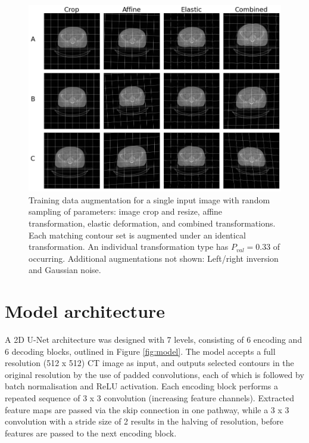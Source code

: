 \begin{figure}[h]
	\begin{center}
		\includegraphics[width=1\textwidth]{figures/augment}
		\caption{Training data augmentation for a single input image with random
      sampling of parameters: image crop and resize, affine transformation,
      elastic deformation, and combined transformations. Each matching contour
      set is augmented under an identical transformation. An individual
      transformation type has $P_{val}=0.33$ of occurring. Additional
      augmentations not shown: Left/right inversion and Gaussian noise.}
		\label{fig:augment}
	\end{center}
\end{figure}

\section{Model architecture}
\label{ch:method-architecture} A 2D U-Net architecture was designed with 7
levels, consisting of 6 encoding and 6 decoding blocks, outlined in Figure
\ref{fig:model}. The model accepts a full resolution (512 x 512) CT image as
input, and outputs selected contours in the original resolution by the use of
padded convolutions, each of which is followed by batch normalisation and ReLU
activation. Each encoding block performs a repeated sequence of 3 x 3
convolution (increasing feature channels). Extracted feature maps are passed via
the skip connection in one pathway, while a 3 x 3 convolution with a stride size
of 2 results in the halving of resolution, before features are passed to the
next encoding block.


